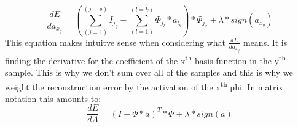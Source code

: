 \documentclass{article}
\begin{document}
\begin{equation}
    \frac{dE}{da_x_y} = (\sum_(j=1)^(j=p)I_j_y - \sum_(l=1)^(l=k)\Phi_j_l* a_l_y)*\Phi_j_x + \lambda * sign(a_x_y)
\end{equation}
This equation makes intuitve sense when considering what $\frac{dE}{da_x_y}$ means. It is finding the derivative for the coefficient of the x\textsuperscript{th} basis function in the y\textsuperscript{th} sample. This is why we don't sum over all of the samples and this is why we weight the reconstruction error by the activation of the x\textsuperscript{th} phi. In matrix notation this amounts to:
\begin{equation}
    \frac{dE}{dA} = (I - \Phi*a)^T*\Phi + \lambda*sign(a)
\end{equation}
\end{document}
